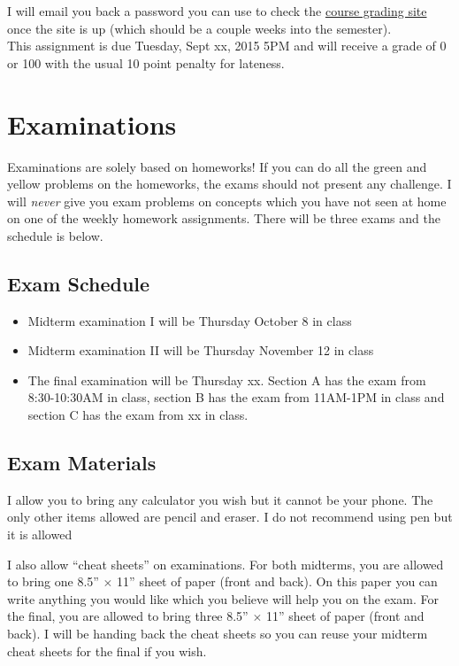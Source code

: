 \documentclass[12pt]{article}
\newcommand{\qu}[1]{``#1''}
\begin{document}
I will email you back a password you can use to check the \href{http://qcgrades.com}{course grading site} once the site is up (which should be a couple weeks into the semester). \\

This assignment is due Tuesday, Sept xx, 2015 5PM and will receive a grade of 0 or 100 with the usual 10 point penalty for lateness.


\section*{Examinations}

Examinations are solely based on homeworks! If you can do all the green and yellow problems on the homeworks, the exams should not present any challenge. I will \textit{never} give you exam problems on concepts which you have not seen at home on one of the weekly homework assignments. There will be three exams and the schedule is below.

\subsection*{Exam Schedule}\label{subsec:exam_schedule}

\begin{itemize}
\itemsep -0.0em 
\item Midterm examination I will be Thursday October 8 in class
\item Midterm examination II will be Thursday November 12 in class
\item The final examination will be Thursday xx. Section A has the exam from 8:30-10:30AM in class, section B has the exam from 11AM-1PM in class and section C has the exam from xx in class.
\end{itemize}

\subsection*{Exam Materials}

I allow you to bring any calculator you wish but it cannot be your phone. The only other items allowed are pencil and eraser. I do not recommend using pen but it is allowed

I also allow \qu{cheat sheets} on examinations. For both midterms, you are allowed to bring one 8.5'' $\times$ 11'' sheet of paper (front and back). On this paper you can write anything you would like which you believe will help you on the exam. For the final, you are allowed to bring three 8.5'' $\times$ 11'' sheet of paper (front and back). I will be handing back the cheat sheets so you can reuse your midterm cheat sheets for the final if you wish. 
\end{document}
